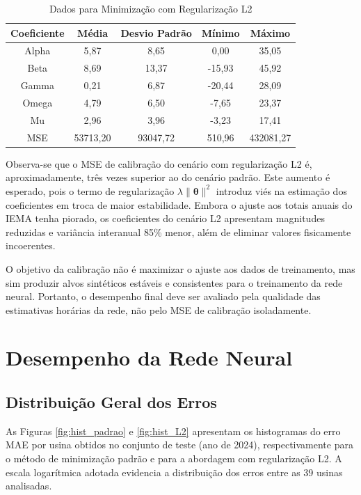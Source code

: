 \begin{table}[H]
    \centering
    \renewcommand{\arraystretch}{1.5}
    \begin{tabular}{|c|c|c|c|c|}
        \hline
        \textbf{Coeficiente} & \textbf{Média} & \textbf{Desvio Padrão} & \textbf{Mínimo} & \textbf{Máximo} \\
        \hline
        Alpha & 5,87 & 8,65 & 0,00 & 35,05 \\
        Beta & 8,69 & 13,37 & -15,93 & 45,92 \\
        Gamma & 0,21 & 6,87 & -20,44 & 28,09 \\
        Omega & 4,79 & 6,50 & -7,65 & 23,37 \\
        Mu & 2,96 & 3,96 & -3,23 & 17,41 \\
        \ac{MSE} & 53713,20 & 93047,72 & 510,96 & 432081,27 \\
        \hline
    \end{tabular}
    \caption{Dados para Minimização com Regularização L2}\label{tab:coeficientes_l2}
\end{table}

Observa-se que o \ac{MSE} de calibração do cenário com regularização L2 é, aproximadamente, três vezes superior ao do cenário padrão. Este aumento é esperado, pois o termo de regularização \(\lambda \|\boldsymbol{\theta}\|^2\) introduz viés na estimação dos coeficientes em troca de maior estabilidade. Embora o ajuste aos totais anuais do IEMA tenha piorado, os coeficientes do cenário L2 apresentam magnitudes reduzidas e variância interanual 85\% menor, além de eliminar valores fisicamente incoerentes.

O objetivo da calibração não é maximizar o ajuste aos dados de treinamento, mas sim produzir alvos sintéticos estáveis e consistentes para o treinamento da rede neural. Portanto, o desempenho final deve ser avaliado pela qualidade das estimativas horárias da rede, não pelo \ac{MSE} de calibração isoladamente.

\section{Desempenho da Rede Neural}

\subsection{Distribuição Geral dos Erros}

As Figuras \ref{fig:hist_padrao} e \ref{fig:hist_L2} apresentam os histogramas do erro \ac{MAE} por usina obtidos no conjunto de teste (ano de 2024), respectivamente para o método de minimização padrão e para a abordagem com regularização L2. A escala logarítmica adotada evidencia a distribuição dos erros entre as 39 usinas analisadas.

